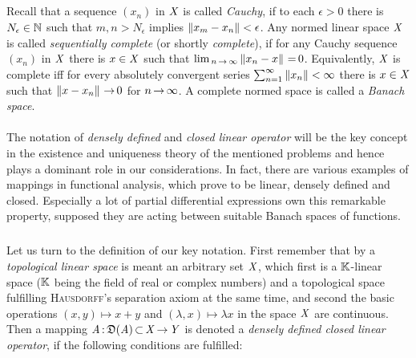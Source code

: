 \documentclass[11pt,twoside]{article}
\begin{document}
\subparagraph{} %
Recall that a sequence $(x_n)$ in $\mathit{X}$ is called \textit{Cauchy},
if to each $\epsilon > 0$ there is $N_{\epsilon} \in {\mathbb{N}}$
such that $m,n > N_{\epsilon}$ implies $\left\lVert x_m-x_n \right\rVert < \epsilon$.
Any normed linear space $\mathit{X}$ is called \textit{sequentially complete}
(or shortly \textit{complete}),
if for any Cauchy sequence $(x_n)$ in $\mathit{X}$
there is $x \in \mathit{X}$
such that $\lim_{\,n {\,\to\,} \infty} \left\lVert x_n-x \right\rVert {\,=\,} 0$.
Equivalently,
$\mathit{X}$ is complete
iff
for every absolutely convergent series
$\sum_{n=1}^{\infty} \left\lVert x_n \right\rVert < \infty$
there is $x \in \mathit{X}$ such that $\left\lVert x-x_n \right\rVert {\,\to\,} 0$ for $n {\,\to\,} \infty$.
A complete normed space is called a \textit{Banach space}.

\paragraph{} %
The notation of \textit{densely defined} and \textit{closed linear operator}
will be the key concept in the existence and uniqueness theory
of the mentioned problems and hence plays a dominant role in our considerations.
In fact,
there are various examples of mappings in functional analysis,
which prove to be linear, densely defined and closed.
Especially a lot of partial differential expressions
own this remarkable property,
supposed they are acting between suitable Banach spaces of functions.

\subparagraph{} %
Let us turn to the definition of our key notation.
First remember that by a \textit{topological linear space}
is meant an arbitrary set $\mathit{X}$,
which first 
is a ${\mathbb{K}}$-linear space
(${\mathbb{K}}$ being the field of real or complex numbers)
and a topological space fulfilling \textsc{Hausdorff}'s separation axiom
at the same time,
and second the basic operations
$(x,y) \mapsto x+y$ and $(\lambda,x) \mapsto \lambda x$ in the space $\mathit{X}$
are continuous.
Then a mapping $\mathit{A} {\,:\,} \mathfrak{D}(\mathit{A}) {\,\subset\,} \mathit{X} {\,\to\,} \mathit{Y}$
is denoted a \textit{densely defined closed linear operator},
if the following conditions are fulfilled:
\end{document}
